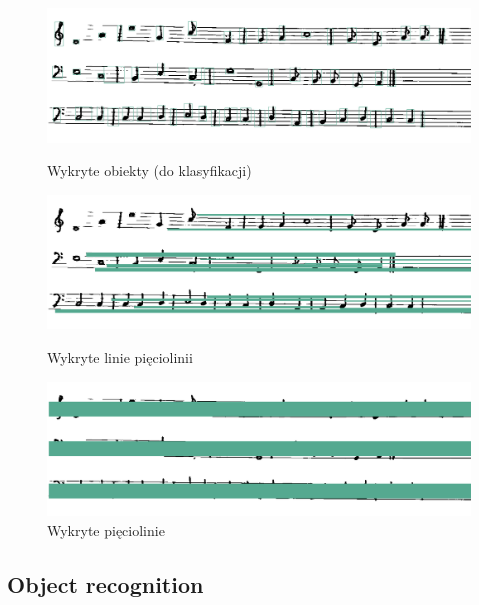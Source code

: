 \documentclass[12pt, letterpaper]{article}
\begin{document}
\begin{figure}
    \centering
    \includegraphics[width = \imagewidth]{7_detected_objects}
    \caption[Detected objects]{Wykryte obiekty (do klasyfikacji)}
    \label{img:detected-objects}
    \includegraphics[width = \imagewidth]{8_detected_stafflines}
    \caption[Detected stafflines]{Wykryte linie pięciolinii}
    \label{img:detected-stafflines}
    \includegraphics[width = \imagewidth]{9_detected_staves}
    \caption[Detected staves]{Wykryte pięciolinie}
    \label{img:detected-staves}
\end{figure}

\subsection{Object recognition}
\label{sec:recognition}
\end{document}
